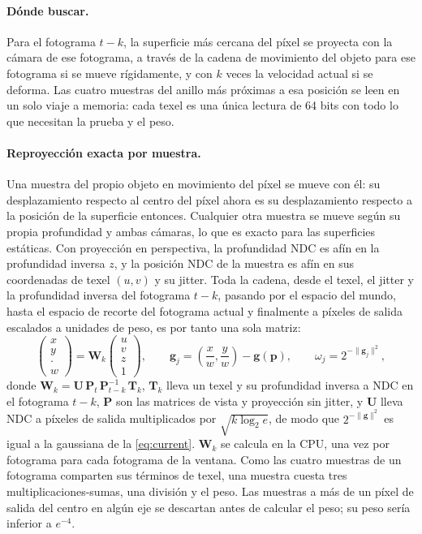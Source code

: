 \documentclass[11pt,a4paper]{article}
\newcommand{\vect}[1]{\mathbf{#1}}
\begin{document}
\paragraph{Dónde buscar.} Para el fotograma $t-k$, la superficie más cercana del píxel se proyecta con la cámara de ese fotograma, a través de la cadena de movimiento del objeto para ese fotograma si se mueve rígidamente, y con $k$ veces la velocidad actual si se deforma. Las cuatro muestras del anillo más próximas a esa posición se leen en un solo viaje a memoria: cada texel es una única lectura de 64 bits con todo lo que necesitan la prueba y el peso.

\paragraph{Reproyección exacta por muestra.} Una muestra del propio objeto en movimiento del píxel se mueve con él: su desplazamiento respecto al centro del píxel ahora es su desplazamiento respecto a la posición de la superficie entonces. Cualquier otra muestra se mueve según su propia profundidad y ambas cámaras, lo que es exacto para las superficies estáticas. Con proyección en perspectiva, la profundidad NDC es afín en la profundidad inversa $z$, y la posición NDC de la muestra es afín en sus coordenadas de texel $(u,v)$ y su jitter. Toda la cadena, desde el texel, el jitter y la profundidad inversa del fotograma $t-k$, pasando por el espacio del mundo, hasta el espacio de recorte del fotograma actual y finalmente a píxeles de salida escalados a unidades de peso, es por tanto una sola matriz:
\begin{equation}
\begin{pmatrix} x\\ y\\ \cdot\\ w \end{pmatrix} = \mathbf{W}_k \begin{pmatrix} u\\ v\\ z\\ 1 \end{pmatrix},
\qquad \vect g_j = \left(\frac{x}{w}, \frac{y}{w}\right) - \vect g(\vect p), \qquad \omega_j = 2^{-\|\vect g_j\|^2},
\label{eq:reproject}
\end{equation}
donde $\mathbf{W}_k = \mathbf{U}\,\mathbf{P}_t\,\mathbf{P}_{t-k}^{-1}\,\mathbf{T}_k$, $\mathbf{T}_k$ lleva un texel y su profundidad inversa a NDC en el fotograma $t-k$, $\mathbf{P}$ son las matrices de vista y proyección sin jitter, y $\mathbf{U}$ lleva NDC a píxeles de salida multiplicados por $\sqrt{k\log_2 e}$, de modo que $2^{-\|\vect g\|^2}$ es igual a la gaussiana de la \cref{eq:current}. $\mathbf{W}_k$ se calcula en la CPU, una vez por fotograma para cada fotograma de la ventana. Como las cuatro muestras de un fotograma comparten sus términos de texel, una muestra cuesta tres multiplicaciones-sumas, una división y el peso. Las muestras a más de un píxel de salida del centro en algún eje se descartan antes de calcular el peso; su peso sería inferior a $e^{-4}$.
\end{document}
